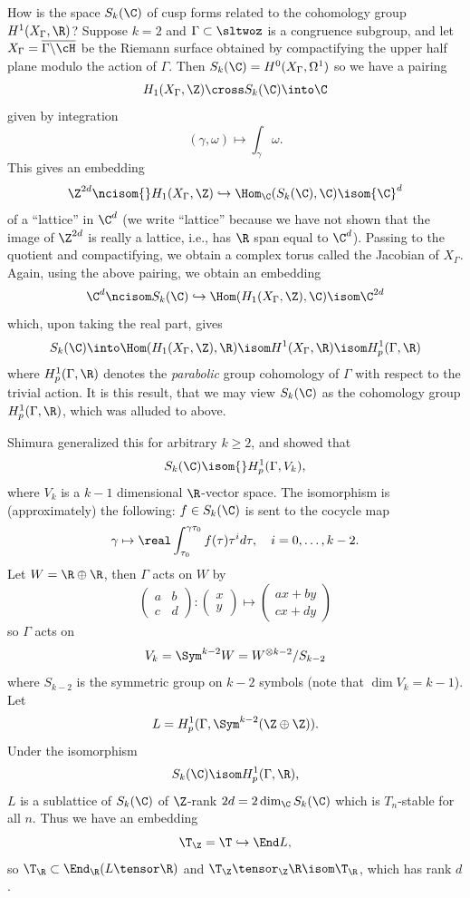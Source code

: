 \documentclass{report}
\begin{document}
How is the space $S_k(\C)$ of cusp forms
related to the cohomology group $H^1(X_{\Gamma},\R)$?
Suppose $k=2$ and $\Gamma\subset\sltwoz$ is a congruence subgroup,
and let $X_{\Gamma}=\overline{\Gamma\backslash\cH}$ be the
Riemann surface obtained by compactifying the upper half plane modulo
the action of $\Gamma$. Then $S_k(\C)=H^0(X_{\Gamma},\Omega^{1})$ so
we have a pairing
$$H_1(X_{\Gamma},\Z)\cross S_k(\C)\into \C$$
given by integration
$$(\gamma,\omega)\mapsto \int_{\gamma}\omega.$$
This gives an embedding
$$\Z^{2d}\ncisom{}H_1(X_{\Gamma},\Z)\hookrightarrow
                      \Hom_{\C}(S_k(\C),\C)\isom {\C}^d$$
of a ``lattice'' in $\C^d$ (we write ``lattice'' because we have not
shown that the image of $\Z^{2d}$ is really a lattice, i.e., has $\R$
span equal to $\C^d$).
Passing to the quotient and compactifying, we obtain a complex torus
called the Jacobian of $X_{\Gamma}.$
Again, using the above pairing, we obtain an embedding
$${\C}^d\ncisom S_k(\C)\hookrightarrow
               \Hom(H_1(X_{\Gamma},\Z),\C)\isom\C^{2d}$$
which, upon taking the real part, gives
$$
S_k(\C) \into \Hom(H_1(X_{\Gamma},\Z),\R)
         \isom H^1(X_{\Gamma},\R) \isom H^1_p(\Gamma,\R)
$$
where $H^1_p(\Gamma,\R)$ denotes the {\em parabolic} group cohomology
of $\Gamma$ with respect to the trivial action. It is this result, that we
may view $S_k(\C)$ as the cohomology group $H^1_p(\Gamma,\R)$, which was
alluded to above.

Shimura generalized this for arbitrary $k\geq 2$, and showed
that $$S_k(\C)\isom{}H_p^1(\Gamma,V_k),$$
where $V_k$ is a $k-1$ dimensional $\R$-vector space.
The isomorphism is (approximately) the following:
$f\in S_k(\C)$ is sent to the cocycle map
$$\gamma\mapsto \real\int_{\tau_0}^{\gamma\tau_0}f(\tau){\tau}^{i}d\tau,\quad
i=0,\ldots,k-2.$$
Let $W=\R\oplus\R$, then $\Gamma$ acts on $W$ by
$$\begin{pmatrix}a&b\\c&d\end{pmatrix}:
  \begin{pmatrix}x\\y\end{pmatrix}\mapsto
  \begin{pmatrix}ax+by\\cx+dy\end{pmatrix}
$$
so $\Gamma$ acts on
$$V_k=\Sym^{k-2}W=W^{\otimes k-2}/S_{k-2}$$
where $S_{k-2}$ is the symmetric group on $k-2$ symbols
(note that $\dim V_k = k-1$).
Let
$$
L=H_p^1(\Gamma,\Sym^{k-2}(\Z\oplus\Z)).
$$
Under the isomorphism
$$
 S_k(\C)\isom H^1_p(\Gamma,\R),
$$
$L$ is a sublattice of $S_k(\C)$ of $\Z$-rank $2d=2\dim_{\C}S_k(\C)$ which
is $T_n$-stable for all $n$. Thus we have an embedding
$$\T_{\Z} = \T \hookrightarrow \End L,$$
so
$\T_{\R}\subset\End_{\R}(L\tensor\R)$
and $\T_{\Z}\tensor_{\Z}\R\isom \T_{\R}$, which has rank $d$.
\end{document}
